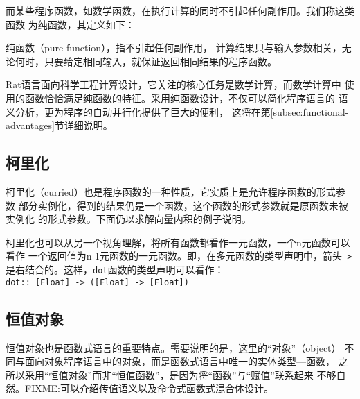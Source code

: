 而某些程序函数，如数学函数，在执行计算的同时不引起任何副作用。我们称这类函数
为纯函数，其定义如下：
\begin{definition}
纯函数（pure function），指不引起任何副作用，
计算结果只与输入参数相关，无论何时，只要给定相同输入，就保证返回相同结果的程序函数。
\end{definition}

Rat语言面向科学工程计算设计，它关注的核心任务是数学计算，而数学计算中
使用的函数恰恰满足纯函数的特征。采用纯函数设计，不仅可以简化程序语言的
语义分析，更为程序的自动并行化提供了巨大的便利，
这将在第\ref{subsec:functional-advantages}节详细说明。

\subsection{柯里化}
柯里化（curried）也是程序函数的一种性质，它实质上是允许程序函数的形式参数
部分实例化，得到的结果仍是一个函数，这个函数的形式参数就是原函数未被实例化
的形式参数。下面仍以求解向量内积的例子说明。
\begin{quotation}
\end{quotation}

柯里化也可以从另一个视角理解，将所有函数都看作一元函数，一个n元函数可以看作
一个返回值为n-1元函数的一元函数。即，在多元函数的类型声明中，箭头\texttt{->}
是右结合的。这样，\texttt{dot}函数的类型声明可以看作：\\
\texttt{dot:: [Float] -> ([Float] -> [Float])}

\subsection{恒值对象}\label{subsec:immutable-object}
恒值对象也是函数式语言的重要特点。需要说明的是，这里的“对象”（object）
不同与面向对象程序语言中的对象，而是函数式语言中唯一的实体类型---函数，
之所以采用“恒值对象”而非“恒值函数”，是因为将“函数”与“赋值”联系起来
不够自然。FIXME:可以介绍传值语义以及命令式函数式混合体设计。

